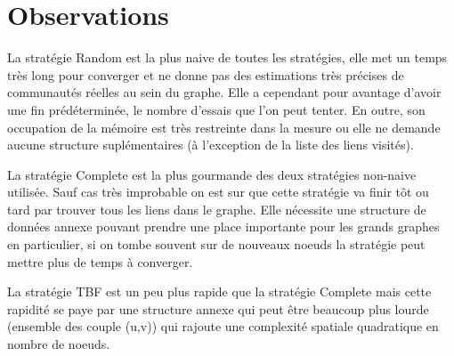\section{Observations}

La stratégie Random est la plus naive de toutes les stratégies,
elle met un temps très long pour converger et ne donne pas des estimations
très précises de communautés réelles au sein du graphe. Elle a cependant
pour avantage d'avoir une fin prédéterminée, le nombre d'essais que l'on peut tenter.
En outre, son occupation de la mémoire est très restreinte dans la mesure ou elle ne demande
aucune structure suplémentaires (à l'exception de la liste des liens visités).

La stratégie Complete est la plus gourmande des deux stratégies non-naive utilisée.
Sauf cas très improbable on est sur que cette stratégie va finir tôt ou tard par trouver
tous les liens dans le graphe. Elle nécessite une structure de données annexe pouvant prendre
une place importante pour les grands graphes en particulier, si on tombe souvent sur de nouveaux noeuds
la stratégie peut mettre plus de temps à converger.

La stratégie TBF est un peu plus rapide que la stratégie Complete mais cette rapidité se paye par
une structure annexe qui peut être beaucoup plus lourde (ensemble des couple (u,v)) qui rajoute une
complexité spatiale quadratique en nombre de noeuds.
